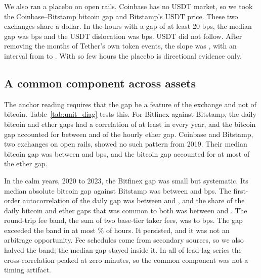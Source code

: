 \documentclass[preprint,10pt]{elsarticle}
\begin{document}
We also ran a placebo on open rails. Coinbase has no USDT market, so we took the Coinbase--Bitstamp bitcoin gap and Bitstamp's USDT price. These two exchanges share a dollar. In the \NumUAnchorPlaceboHours{} hours with a gap of at least 20 bps, the median gap was \NumUAnchorPlaceboL{} bps and the USDT dislocation was \NumUAnchorPlaceboD{} bps. USDT did not follow. After removing the months of Tether's own token events, the slope was \NumUAnchorPlaceboSlope{}, with an interval from \NumUAnchorPlaceboSlopeLo{} to \NumUAnchorPlaceboSlopeHi{}. With so few hours the placebo is directional evidence only.

\subsection{A common component across assets}

The anchor reading requires that the gap be a feature of the exchange and not of bitcoin. Table~\ref{tab:unit_diag} tests this. For Bitfinex against Bitstamp, the daily bitcoin and ether gaps had a correlation of at least \NumUBfxBstCorrMinExact{} in every year, and the bitcoin gap accounted for between \NumUBfxBstShareMin{} and \NumUBfxBstShareMax{} of the hourly ether gap. Coinbase and Bitstamp, two exchanges on open rails, showed no such pattern from 2019. Their median bitcoin gap was between \NumUCbBstGapMin{} and \NumUCbBstGapMax{} bps, and the bitcoin gap accounted for at most \NumUCbBstShareMax{} of the ether gap.

In the calm years, 2020 to 2023, the Bitfinex gap was small but systematic. Its median absolute bitcoin gap against Bitstamp was between \NumNBfxBstGapBtcMin{} and \NumNBfxBstGapBtcMax{} bps. The first-order autocorrelation of the daily gap was between \NumNBfxBstAcOneMin{} and \NumNBfxBstAcOneMax{}, and the share of the daily bitcoin and ether gaps that was common to both was between \NumNBfxBstCommonDailyMin{} and \NumNBfxBstCommonDailyMax{}. The round-trip fee band, the sum of two base-tier taker fees, was \NumNBandMin{} to \NumNBandMax{} bps. The gap exceeded the band in at most \NumNCalmAboveBandMaxPct\% of hours. It persisted, and it was not an arbitrage opportunity. Fee schedules come from secondary sources, so we also halved the band; the median gap stayed inside it. In all \NumNLagZeroCount{} of \NumNLagTotal{} lead-lag series the cross-correlation peaked at zero minutes, so the common component was not a timing artifact.
\end{document}
